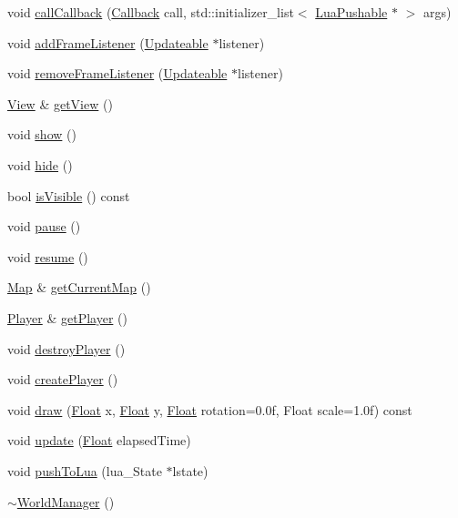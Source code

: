 \begin{DoxyCompactItemize}
\item 
void \hyperlink{classZeta_1_1WorldManager_a6d43e79fd3eaa735fc80eec3dd992415}{call\+Callback} (\hyperlink{classZeta_1_1WorldManager_a196f5dc39fe2f6856871fef729fd8454}{Callback} call, std\+::initializer\+\_\+list$<$ \hyperlink{classZeta_1_1LuaPushable}{Lua\+Pushable} $\ast$ $>$ args)
\item 
void \hyperlink{classZeta_1_1WorldManager_af27c2652f615e62ee9d3cbb28756b742}{add\+Frame\+Listener} (\hyperlink{classZeta_1_1Updateable}{Updateable} $\ast$listener)
\item 
void \hyperlink{classZeta_1_1WorldManager_ab444e385222889cf97a06463f71e5779}{remove\+Frame\+Listener} (\hyperlink{classZeta_1_1Updateable}{Updateable} $\ast$listener)
\item 
\hyperlink{classZeta_1_1View}{View} \& \hyperlink{classZeta_1_1WorldManager_a6e3c639b3e1590fea2b80f472c939aff}{get\+View} ()
\item 
void \hyperlink{classZeta_1_1WorldManager_a59601c687f891b38fab7c0b1fbaa81eb}{show} ()
\item 
void \hyperlink{classZeta_1_1WorldManager_a7858c75a716e69474d9d21e0cd41f5fe}{hide} ()
\item 
bool \hyperlink{classZeta_1_1WorldManager_a5a9401c91d123282504348d32ecbf97d}{is\+Visible} () const 
\item 
void \hyperlink{classZeta_1_1WorldManager_a8ca30f060db7d05295164b518c1e885d}{pause} ()
\item 
void \hyperlink{classZeta_1_1WorldManager_a3faed000bf683263268010617dae724f}{resume} ()
\item 
\hyperlink{classZeta_1_1Map}{Map} \& \hyperlink{classZeta_1_1WorldManager_a0964944ead294c9d71599e1291b2aa07}{get\+Current\+Map} ()
\item 
\hyperlink{classZeta_1_1Player}{Player} \& \hyperlink{classZeta_1_1WorldManager_abfb5cbf7a6c7182497cbd87d2981b84b}{get\+Player} ()
\item 
void \hyperlink{classZeta_1_1WorldManager_a65ddaf0bc1c23045fae585c175f3aeaf}{destroy\+Player} ()
\item 
void \hyperlink{classZeta_1_1WorldManager_a7d59c68fff6d102540a05dade8672c99}{create\+Player} ()
\item 
void \hyperlink{classZeta_1_1WorldManager_a695f5b869c76518c338529caa44538db}{draw} (\hyperlink{namespaceZeta_a1e0a1265f9b3bd3075fb0fabd39088ba}{Float} x, \hyperlink{namespaceZeta_a1e0a1265f9b3bd3075fb0fabd39088ba}{Float} y, \hyperlink{namespaceZeta_a1e0a1265f9b3bd3075fb0fabd39088ba}{Float} rotation=0.\+0f, Float scale=1.\+0f) const 
\item 
void \hyperlink{classZeta_1_1WorldManager_ad6eec6454808f4d8c7aa1110087d55e6}{update} (\hyperlink{namespaceZeta_a1e0a1265f9b3bd3075fb0fabd39088ba}{Float} elapsed\+Time)
\item 
void \hyperlink{classZeta_1_1WorldManager_a3a267423a70758aa2b72ad311e19e8d7}{push\+To\+Lua} (lua\+\_\+\+State $\ast$lstate)
\item 
\hyperlink{classZeta_1_1WorldManager_a29467359dc0134b3d60f1f88bd820e63}{$\sim$\+World\+Manager} ()
\end{DoxyCompactItemize}
